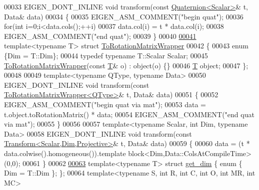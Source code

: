 \begin{DoxyCode}
00033 EIGEN\_DONT\_INLINE \textcolor{keywordtype}{void} transform(\textcolor{keyword}{const} \hyperlink{group___geometry___module_class_eigen_1_1_quaternion}{Quaternion<Scalar>}& t, Data& data)
00034 \{
00035   EIGEN\_ASM\_COMMENT(\textcolor{stringliteral}{"begin quat"});
00036   \textcolor{keywordflow}{for}(\textcolor{keywordtype}{int} i=0;i<data.cols();++i)
00037     data.col(i) = t * data.col(i);
00038   EIGEN\_ASM\_COMMENT(\textcolor{stringliteral}{"end quat"});
00039 \}
00040 
\hyperlink{struct_to_rotation_matrix_wrapper}{00041} \textcolor{keyword}{template}<\textcolor{keyword}{typename} T> \textcolor{keyword}{struct }\hyperlink{struct_to_rotation_matrix_wrapper}{ToRotationMatrixWrapper}
00042 \{
00043   \textcolor{keyword}{enum} \{Dim = T::Dim\};
00044   \textcolor{keyword}{typedef} \textcolor{keyword}{typename} T::Scalar Scalar;
00045   \hyperlink{struct_to_rotation_matrix_wrapper}{ToRotationMatrixWrapper}(\textcolor{keyword}{const} \hyperlink{group___sparse_core___module}{T}& o) : object(o) \{\}
00046   \hyperlink{group___sparse_core___module}{T} object;
00047 \};
00048 
00049 \textcolor{keyword}{template}<\textcolor{keyword}{typename} QType, \textcolor{keyword}{typename} Data>
00050 EIGEN\_DONT\_INLINE \textcolor{keywordtype}{void} transform(\textcolor{keyword}{const} \hyperlink{struct_to_rotation_matrix_wrapper}{ToRotationMatrixWrapper<QType>}& t, 
      Data& data)
00051 \{
00052   EIGEN\_ASM\_COMMENT(\textcolor{stringliteral}{"begin quat via mat"});
00053   data = t.object.toRotationMatrix() * data;
00054   EIGEN\_ASM\_COMMENT(\textcolor{stringliteral}{"end quat via mat"});
00055 \}
00056 
00057 \textcolor{keyword}{template}<\textcolor{keyword}{typename} Scalar, \textcolor{keywordtype}{int} Dim, \textcolor{keyword}{typename} Data>
00058 EIGEN\_DONT\_INLINE \textcolor{keywordtype}{void} transform(\textcolor{keyword}{const} \hyperlink{group___geometry___module_class_eigen_1_1_transform}{Transform<Scalar,Dim,Projective>}& t,
       Data& data)
00059 \{
00060   data = (t * data.colwise().homogeneous()).\textcolor{keyword}{template} block<Dim,Data::ColsAtCompileTime>(0,0);
00061 \}
00062 
\hyperlink{structget__dim}{00063} \textcolor{keyword}{template}<\textcolor{keyword}{typename} T> \textcolor{keyword}{struct }\hyperlink{structget__dim}{get\_dim} \{ \textcolor{keyword}{enum} \{ Dim = T::Dim \}; \};
00064 \textcolor{keyword}{template}<\textcolor{keyword}{typename} S, \textcolor{keywordtype}{int} R, \textcolor{keywordtype}{int} C, \textcolor{keywordtype}{int} O, \textcolor{keywordtype}{int} MR, \textcolor{keywordtype}{int} MC>

\end{DoxyCode}
